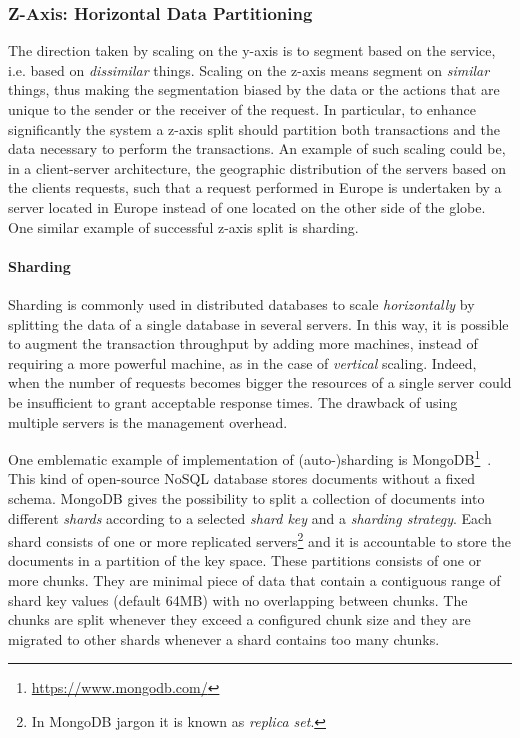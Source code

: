 \subsubsection{Z-Axis: Horizontal Data Partitioning}

The direction taken by scaling on the y-axis is to segment based on the service,
i.e. based on \emph{dissimilar} things. Scaling on the z-axis means segment on
\emph{similar} things, thus making the segmentation biased by the data or the
actions that are unique to the sender or the receiver of the request. In
particular, to enhance significantly the system a z-axis split should partition
both transactions and the data necessary to perform the transactions. 
An example of such scaling could be, in a client-server architecture, the 
geographic distribution of the servers based on the clients requests, such that 
a request performed in Europe is undertaken by a server located in Europe 
instead of one located on the other side of the globe. One similar example of
successful z-axis split is sharding.

\paragraph{Sharding} 
Sharding is commonly used in distributed databases to scale \emph{horizontally}
by splitting the data of a single database in several servers. In this way, it
is possible to augment the transaction throughput by adding more machines, 
instead of requiring a more powerful machine, as in the case of \emph{vertical} 
scaling.
Indeed, when the number of requests becomes bigger the resources of a 
single server could be insufficient to grant acceptable response times. The
drawback of using multiple servers is the management overhead.

One emblematic example of implementation of (auto-)sharding is
MongoDB\footnote{\url{https://www.mongodb.com/}}~\cite{bib:mongodb}. This kind
of open-source NoSQL database stores documents without a fixed schema.
MongoDB gives the possibility to split a collection of documents into 
different \emph{shards} according to a selected \emph{shard key} and a 
\emph{sharding strategy}. Each shard consists of one or more replicated 
servers\footnote{In MongoDB jargon it is known as \emph{replica set}.} and
it is accountable to store the documents in a partition of the key space.
These partitions consists of one or more chunks. They are minimal piece of data
that contain a contiguous range of shard key values (default 64MB) with no
overlapping between chunks. The chunks are split whenever they exceed a 
configured chunk size and they are migrated to other shards whenever a shard 
contains too many chunks.

